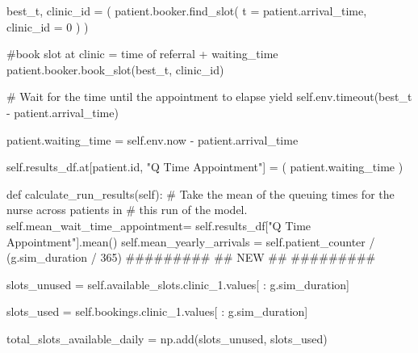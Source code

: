 \documentclass[
  letterpaper,
  DIV=11,
  numbers=noendperiod]{scrreprt}
\newenvironment{Shaded}{}{}
\newcommand{\BuiltInTok}[1]{\textcolor[rgb]{0.84,0.23,0.29}{#1}}
\newcommand{\CommentTok}[1]{\textcolor[rgb]{0.42,0.45,0.49}{#1}}
\newcommand{\ControlFlowTok}[1]{\textcolor[rgb]{0.84,0.23,0.29}{#1}}
\newcommand{\DecValTok}[1]{\textcolor[rgb]{0.00,0.36,0.77}{#1}}
\newcommand{\KeywordTok}[1]{\textcolor[rgb]{0.84,0.23,0.29}{#1}}
\newcommand{\NormalTok}[1]{\textcolor[rgb]{0.14,0.16,0.18}{#1}}
\newcommand{\OperatorTok}[1]{\textcolor[rgb]{0.14,0.16,0.18}{#1}}
\newcommand{\StringTok}[1]{\textcolor[rgb]{0.01,0.18,0.38}{#1}}
\newcommand{\VariableTok}[1]{\textcolor[rgb]{0.89,0.38,0.04}{#1}}
\newcommand*\circled[1]{\tikz[baseline=(char.base)]{
          \node[shape=circle,draw,inner sep=1pt] (char) {{\scriptsize#1}};}}
\begin{document}
\begin{Shaded}
\begin{Highlighting}[]
\NormalTok{        best\_t, clinic\_id }\OperatorTok{=}\NormalTok{ (}
\NormalTok{                patient.booker.find\_slot(}
\NormalTok{                  t }\OperatorTok{=}\NormalTok{ patient.arrival\_time, }\hspace*{\fill}\NormalTok{\circled{1}}
\NormalTok{                  clinic\_id }\OperatorTok{=} \DecValTok{0} \hspace*{\fill}\NormalTok{\circled{2}}
\NormalTok{                  )}
\NormalTok{        )}

        \CommentTok{\#book slot at clinic = time of referral + waiting\_time}
\NormalTok{        patient.booker.book\_slot(best\_t, clinic\_id)}

        \CommentTok{\# Wait for the time until the appointment to elapse}
        \ControlFlowTok{yield} \VariableTok{self}\NormalTok{.env.timeout(best\_t }\OperatorTok{{-}}\NormalTok{ patient.arrival\_time)}

\NormalTok{        patient.waiting\_time }\OperatorTok{=} \VariableTok{self}\NormalTok{.env.now }\OperatorTok{{-}}\NormalTok{ patient.arrival\_time}

        \VariableTok{self}\NormalTok{.results\_df.at[patient.}\BuiltInTok{id}\NormalTok{, }\StringTok{"Q Time Appointment"}\NormalTok{] }\OperatorTok{=}\NormalTok{ (}
\NormalTok{                  patient.waiting\_time}
\NormalTok{                  )}

    \KeywordTok{def}\NormalTok{ calculate\_run\_results(}\VariableTok{self}\NormalTok{):}
        \CommentTok{\# Take the mean of the queuing times for the nurse across patients in}
        \CommentTok{\# this run of the model.}
        \VariableTok{self}\NormalTok{.mean\_wait\_time\_appointment}\OperatorTok{=} \VariableTok{self}\NormalTok{.results\_df[}\StringTok{"Q Time Appointment"}\NormalTok{].mean()}
        \VariableTok{self}\NormalTok{.mean\_yearly\_arrivals }\OperatorTok{=} \VariableTok{self}\NormalTok{.patient\_counter }\OperatorTok{/}\NormalTok{ (g.sim\_duration }\OperatorTok{/} \DecValTok{365}\NormalTok{)}
        \CommentTok{\#\#\#\#\#\#\#\#\#}
        \CommentTok{\#\# NEW \#\#}
        \CommentTok{\#\#\#\#\#\#\#\#\#}

\NormalTok{        slots\_unused }\OperatorTok{=} \VariableTok{self}\NormalTok{.available\_slots.clinic\_1.values[ : g.sim\_duration]}

\NormalTok{        slots\_used }\OperatorTok{=} \VariableTok{self}\NormalTok{.bookings.clinic\_1.values[ : g.sim\_duration]}

\NormalTok{        total\_slots\_available\_daily }\OperatorTok{=}\NormalTok{ np.add(slots\_unused, slots\_used)}


\end{Highlighting}
\end{Shaded}
\end{document}
